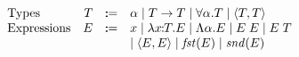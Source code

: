 \[ \begin{array}{lrrl}
  \text{Types} & T & \dcoloneq &
    \alpha
    \mid T \to T
    \mid \univquant{\alpha}{T}
    \mid \langle T, T \rangle \\

  \text{Expressions} & E & \dcoloneq &
    x
    \mid \abs{\rel{x}{T}}{E}
    \mid \Abs{\alpha}{E}
    \mid \app{E}{E}
    \mid \app{E}{T} \\ & & &
    \mid \langle E, E \rangle
    \mid \meta{fst} E
    \mid \meta{snd} E
\end{array} \]
